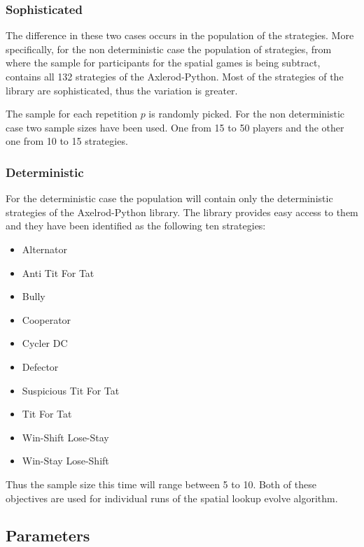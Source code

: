 \subsubsection{Sophisticated}

The difference in these two cases occurs in the population of the strategies.
More specifically, for the non deterministic case
the population of strategies, from where the sample for participants for
the spatial games is being subtract, contains all 132 strategies of the
Axlerod-Python. Most of the strategies of the library are sophisticated, thus
the variation is greater.

The sample for each repetition \(p\) is randomly picked. For the
non deterministic case two sample sizes have been used. One from
15 to 50 players and the other one from 10 to 15 strategies.

\subsubsection{Deterministic}

For the deterministic case the population will contain only
the deterministic strategies of the Axelrod-Python library. The library provides
easy access to them and they have been identified as the following ten strategies:
\begin{itemize}
   \item Alternator
   \item Anti Tit For Tat
   \item Bully
   \item Cooperator
   \item Cycler DC
   \item Defector
   \item Suspicious Tit For Tat
   \item Tit For Tat
   \item Win-Shift Lose-Stay
   \item Win-Stay Lose-Shift
\end{itemize}

Thus the sample size this time will range between 5 to 10. Both of these
objectives are used for individual runs of the spatial lookup evolve algorithm.

\subsection{Parameters}

